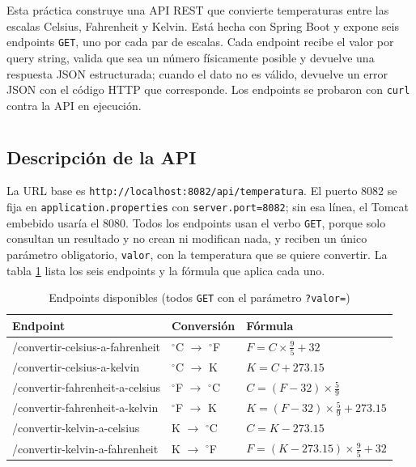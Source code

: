 \documentclass[10pt,a4paper]{article}
\newcommand{\gC}{\ensuremath{^{\circ}}C}
\newcommand{\gF}{\ensuremath{^{\circ}}F}
\begin{document}
\pagebreak

\section{\color{colorIPN}{Introducción}}

Esta práctica construye una API REST que convierte temperaturas entre las escalas Celsius, Fahrenheit y Kelvin. Está hecha con Spring Boot y expone seis endpoints \texttt{GET}, uno por cada par de escalas. Cada endpoint recibe el valor por query string, valida que sea un número físicamente posible y devuelve una respuesta JSON estructurada; cuando el dato no es válido, devuelve un error JSON con el código HTTP que corresponde. Los endpoints se probaron con \texttt{curl} contra la API en ejecución.

\section{\color{colorIPN}{Desarrollo de la API}}

\subsection{Descripción de la API}

La URL base es \texttt{http://localhost:8082/api/temperatura}. El puerto 8082 se fija en \texttt{application.properties} con \texttt{server.port=8082}; sin esa línea, el Tomcat embebido usaría el 8080. Todos los endpoints usan el verbo \texttt{GET}, porque solo consultan un resultado y no crean ni modifican nada, y reciben un único parámetro obligatorio, \texttt{valor}, con la temperatura que se quiere convertir. La tabla \ref{tab:endpoints} lista los seis endpoints y la fórmula que aplica cada uno.

\begin{table}[H]
	\centering
	\small
	\begin{tabular}{>{\ttfamily\footnotesize}p{6.4cm} l l}
		\toprule
		\textrm{\textbf{Endpoint}} & \textbf{Conversión} & \textbf{Fórmula} \\
		\midrule
		/convertir-celsius-a-fahrenheit & \gC{} $\rightarrow$ \gF{} & $F = C \times \frac{9}{5} + 32$ \\
		/convertir-celsius-a-kelvin & \gC{} $\rightarrow$ K & $K = C + 273.15$ \\
		/convertir-fahrenheit-a-celsius & \gF{} $\rightarrow$ \gC{} & $C = (F - 32) \times \frac{5}{9}$ \\
		/convertir-fahrenheit-a-kelvin & \gF{} $\rightarrow$ K & $K = (F - 32) \times \frac{5}{9} + 273.15$ \\
		/convertir-kelvin-a-celsius & K $\rightarrow$ \gC{} & $C = K - 273.15$ \\
		/convertir-kelvin-a-fahrenheit & K $\rightarrow$ \gF{} & $F = (K - 273.15) \times \frac{9}{5} + 32$ \\
		\bottomrule
	\end{tabular}
	\caption{Endpoints disponibles (todos \texttt{GET} con el parámetro \texttt{?valor=})}
	\label{tab:endpoints}
\end{table}
\end{document}
